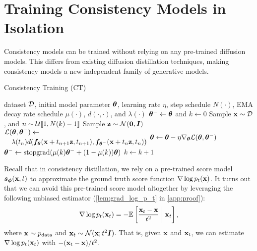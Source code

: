 \section{Training Consistency Models in Isolation}\label{sec:generation}
Consistency models can be trained without relying on any pre-trained diffusion models. This differs from existing diffusion distillation techniques, making consistency models a new independent family of generative models.
\begin{algorithm}[tb]
    \caption{Consistency Training (CT)}
        \label{alg:dtct}
        \begin{algorithmic}
         dataset $\mathcal{D}$, initial model parameter ${\bm{\theta}}$, learning rate $\eta$, step schedule $N(\cdot)$, EMA decay rate schedule $\mu(\cdot)$, $d(\cdot, \cdot)$, and $\lambda(\cdot)$
        \STATE ${\bm{\theta}}^- \gets {\bm{\theta}}$ and $k \gets 0$
        \REPEAT
        \STATE Sample ${\mathbf{x}} \sim \mathcal{D}$, and $n \sim \mathcal{U}\llbracket 1,N(k)-1 \rrbracket$
        \STATE Sample ${\mathbf{z}} \sim \mathcal{N}(\bm{0}, {\bm{I}})$
        \STATE $\begin{multlined}
            \mcal{L}(\vtheta, \vtheta^{-}) \gets \\
            \lambda(t_n) d(\vf_\vtheta(\rvx + t_{n+1} \rvz, t_{n+1}),\vf_{\vtheta^-}(\rvx + t_n \rvz, t_n))
        \end{multlined}$
        \STATE ${\bm{\theta}} \gets {\bm{\theta}} - \eta \nabla_{\bm{\theta}} \mathcal{L}({\bm{\theta}}, {\bm{\theta}}^{-})$
        \STATE ${\bm{\theta}}^- \gets \operatorname{stopgrad}(\mu(k) {\bm{\theta}}^- + (1-\mu(k)) {\bm{\theta}})$
        \STATE $k \gets k + 1$
    \end{algorithmic}
\end{algorithm}

Recall that in consistency distillation, we rely on a pre-trained score model ${\bm{s}}_{\bm{\phi}}({\mathbf{x}}, t)$ to approximate the ground truth score function $\nabla \log p_t({\mathbf{x}})$. It turns out that we can avoid this pre-trained score model altogether by leveraging the following unbiased estimator (\cref{lem:grad_log_p_t} in \cref{app:proof}):
\begin{align*}
    \nabla \log p_t({\mathbf{x}}_t) = -\mathbb{E}\left[ \frac{{\mathbf{x}}_t - {\mathbf{x}}}{t^2} \mathrel\bigg| {\mathbf{x}}_t \right],
\end{align*}
where ${\mathbf{x}}\sim p_\text{data}$ and ${\mathbf{x}}_t \sim \mathcal{N}({\mathbf{x}}; t^2 {\bm{I}})$. That is, given ${\mathbf{x}}$ and ${\mathbf{x}}_t$, we can estimate $\nabla \log p_t({\mathbf{x}}_t)$ with $-({\mathbf{x}}_t-{\mathbf{x}})/t^2$.

